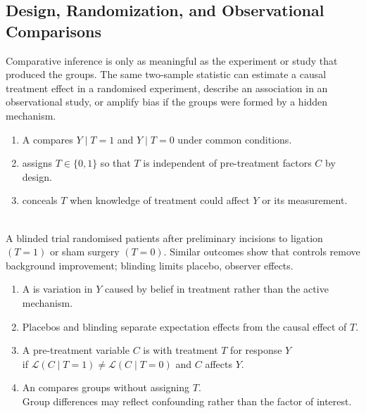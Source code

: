 \subsection{Design, Randomization, and Observational Comparisons}

Comparative inference is only as meaningful as the experiment or study that produced the groups.  The same two-sample statistic can estimate a causal treatment effect in a randomised experiment, describe an association in an observational study, or amplify bias if the groups were formed by a hidden mechanism.

\begin{definition} \label{def:controls-randomization-and-blinding} 
\begin{enumerate}[label=(\roman*)]
\setlength{\itemsep}{0pt}
\item A  compares $Y\mid T=1$ and $Y\mid T=0$ under common conditions.
\item {} assigns $T\in\{0,1\}$ so that $T$ is independent of pre-treatment factors $C$ by design.
\item {} conceals $T$ when knowledge of treatment could affect $Y$ or its measurement.
\end{enumerate}
\end{definition}

\begin{example} \label{ex:mammary-artery-ligation-design} \\
A blinded trial randomised patients after preliminary incisions to ligation $(T=1)$ or sham surgery $(T=0)$. Similar outcomes show that controls remove background improvement; blinding limits placebo, observer effects.
\end{example}

\begin{definition} \label{def:placebo-effect-and-confounding} 
\begin{enumerate}[label=(\roman*)]
\setlength{\itemsep}{0pt}
\item A  is variation in $Y$ caused by belief in treatment rather than the active mechanism.
\item Placebos and blinding separate expectation effects from the causal effect of $T$.
\item A pre-treatment variable $C$ is  with treatment $T$ for response $Y$\\
if $\mathcal{L}(C\mid T=1)\neq\mathcal{L}(C\mid T=0)$ and $C$ affects $Y$.
\item An  compares groups without assigning $T$.\\
Group differences may reflect confounding rather than the factor of interest.
\end{enumerate}
\end{definition}

